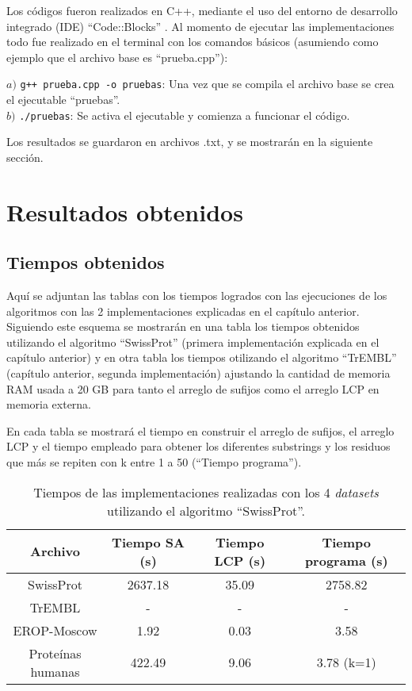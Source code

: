 Los códigos fueron realizados en C++, mediante el uso del entorno de desarrollo integrado (IDE) ``Code::Blocks'' \cite{codeblocks}. Al momento de ejecutar las implementaciones todo fue realizado en el terminal con los comandos básicos (asumiendo como ejemplo que el archivo base es ``prueba.cpp''):

$a)$ \texttt{g++ prueba.cpp -o pruebas}: Una vez que se compila el archivo base se crea el ejecutable ``pruebas''.\\
$b)$ \texttt{./pruebas}: Se activa el ejecutable y comienza a funcionar el código.

Los resultados se guardaron en archivos .txt, y se mostrarán en la siguiente sección.

\section{Resultados obtenidos}

\subsection{Tiempos obtenidos}

Aquí se adjuntan las tablas con los tiempos logrados con las ejecuciones de los algoritmos con las 2 implementaciones explicadas en el capítulo anterior. Siguiendo este esquema se mostrarán en una tabla los tiempos obtenidos utilizando el algoritmo ``SwissProt'' (primera implementación explicada en el capítulo anterior) y en otra tabla los tiempos otilizando el algoritmo ``TrEMBL'' (capítulo anterior, segunda implementación) ajustando la cantidad de memoria RAM usada a 20 GB para tanto el arreglo de sufijos como el arreglo LCP en memoria externa. 

En cada tabla se mostrará el tiempo en construir el arreglo de sufijos, el arreglo LCP y el tiempo empleado para obtener los diferentes substrings y los residuos que más se repiten con k entre 1 a 50 (``Tiempo programa'').

\begin{table}[h]
\centering
\label{my-labelr3}
\begin{tabular}{|c|c|c|c|}
\hline
\textbf{Archivo}  & \textbf{Tiempo SA (s)} & \textbf{Tiempo LCP (s)} & \textbf{Tiempo programa (s)} \\ \hline
SwissProt         & 2637.18                & 35.09                   & 2758.82                         \\
TrEMBL            & -                & -                &        -                  \\
EROP-Moscow       & 1.92                   & 0.03                    & 3.58                         \\
Proteínas humanas & 422.49                 & 9.06                    & 3.78 (k=1)                         \\ \hline
\end{tabular}
\caption{Tiempos de las implementaciones realizadas con los 4 \textit{datasets} utilizando el algoritmo ``SwissProt''.}
\end{table}

